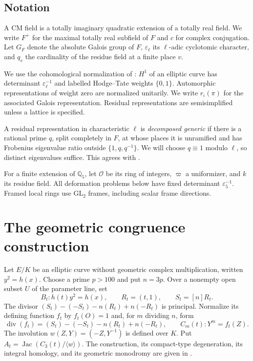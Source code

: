\documentclass[11pt,a4paper]{article}
\numberwithin{equation}{section}
\begin{document}
\subsection*{Notation}

A CM field is a totally imaginary quadratic extension of a totally real field. We write \(F^+\) for the maximal totally real subfield of \(F\) and \(c\) for complex conjugation. Let \(G_F\) denote the absolute Galois group of \(F\), \(\varepsilon_\ell\) its \(\ell\)-adic cyclotomic character, and \(q_v\) the cardinality of the residue field at a finite place \(v\).

We use the cohomological normalization of \cite{CN}: \(H^1\) of an elliptic curve has determinant \(\varepsilon_\ell^{-1}\) and labelled Hodge--Tate weights \(\{0,1\}\). Automorphic representations of weight zero are normalized unitarily. We write \(r_\iota(\pi)\) for the associated Galois representation. Residual representations are semisimplified unless a lattice is specified.

A residual representation in characteristic \(\ell\) is \emph{decomposed generic} if there is a rational prime \(q\), split completely in \(F\), at whose places it is unramified and has Frobenius eigenvalue ratio outside \(\{1,q,q^{-1}\}\). We will choose \(q\equiv1\) modulo \(\ell\), so distinct eigenvalues suffice. This agrees with \cite[Definition~2.1.27]{CN}.

For a finite extension of \(\mathbb Q_5\), let \(\mathcal O\) be its ring of integers, \(\varpi\) a uniformizer, and \(k\) its residue field. All deformation problems below have fixed determinant \(\varepsilon_5^{-1}\). Framed local rings use \(\mathrm{GL}_2\) frames, including scalar frame directions.

\section{The geometric congruence construction}

Let \(E/K\) be an elliptic curve without geometric complex multiplication, written \(y^2=h(x)\). Choose a prime \(p>100\) and put \(n=3p\). Over a nonempty open subset \(U\) of the parameter line, set
\begin{equation*}
B_t:h(t)y^2=h(x),\qquad R_t=(t,1),\qquad S_t=[n]R_t.
\end{equation*}
The divisor \((S_t)-(-S_t)-n(R_t)+n(-R_t)\) is principal. Normalize its defining function \(f_t\) by \(f_t(O)=1\) and, for \(m\) dividing \(n\), form
\begin{equation*}
\operatorname{div}(f_t)=(S_t)-(-S_t)-n(R_t)+n(-R_t),
\qquad C_m(t):Y^m=f_t(Z).
\end{equation*}
The involution \(w(Z,Y)=(-Z,Y^{-1})\) is defined over \(K\). Put \(A_t=\operatorname{Jac}(C_3(t)/\langle w\rangle)\). The construction, its compact-type degeneration, its integral homology, and its geometric monodromy are given in \cite[Lemma~3.1, Proposition~3.3, Proposition~4.2, and Theorem~4.5]{O}.
\end{document}
